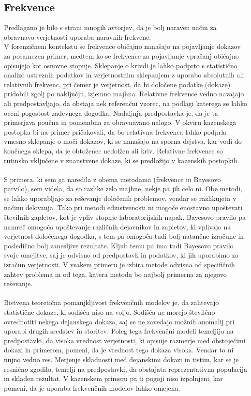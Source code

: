 \documentclass[12pt,a4paper]{amsart}
\theoremstyle{definition} %
\theoremstyle{plain} %
\begin{document}
\subsection{Frekvence}
Predlagano je bilo s strani mnogih avtorjev, da je bolj naraven način za obravnavo verjetnosti uporaba naravnih frekvenc.\\
V forenzičnem kontekstu se frekvence običajno nanašajo na pojavljanje dokazov za posamezen primer, medtem ko se frekvence za
pojavljanje vprašanj običajno opisujejo kot osnovne stopnje. Sklepanje o krivdi je lahko podprto s statistično analizo
ustreznih podatkov in verjetnostnim sklepanjem z uporabo absolutnih ali relativnih frekvenc, pri čemer je verjetnost, da bi določene
podatke (dokaze) pridobili zgolj po naključju, izjemno majhna. Relativne frekvence vedno navajajo ali predpostavljajo, da obstaja nek
referenčni vzorec, na podlagi katerega se lahko oceni pogostost zadevnega dogodka. Nadaljnja predpostavka je, da je ta primerjava poučna
in pomembna za obravnavano nalogo. V okviru kazenskega postopka bi na primer pričakovali, da bo relativna frekvenca lahko podprla
vmesno sklepanje o moči dokazov, ki se nanašajo na sporna dejstva, kar vodi do končnega sklepa, da je obtoženec nedolžen ali kriv. Relativne
frekvence so rutinsko vključene v znanstvene dokaze, ki se predložijo v kazenskih postopkih.\\\\
S primera, ki sem ga naredila z obema metodama (frekvence in Bayesovo parvilo), sem videla, da so razlike zelo majhne, nekje pa jih celo ni.  Obe metodi, 
se lahko uporabljajo za reševanje določenih problemov, vendar se razlikujeta v načinu delovanja. Tako pri metodi edinstvenosti ni mogoče enostavno 
upoštevati številnih zapletov, kot je vpliv stopnje laboratorijskih napak. Bayesovo pravilo pa namreč omogoča upoštevanje različnih dejavnikov in 
zapletov, ki vplivajo na verjetnost določenega dogodka, s tem pa omogoča tudi bolj natančne izračune in posledično bolj zanesljive rezultate. Kljub 
temu pa ima tudi Bayesovo pravilo svoje omejitve, saj je odvisno od predpostavk in podatkov, ki jih uporabimo za izračun verjetnosti. V vsakem primeru je 
izbira metode odvisna od specifičnih zahtev problema in od tega, katera metoda bo najbolj primerna za njegovo reševanje.\\\\
Bistvena teoretična pomanjkljivost frekvenčnih modelov je, 
da zahtevajo statistične dokaze, ki sodišču niso na voljo. Sodišča ne morejo številčno ovrednotiti nekega dejanskega dokaza, saj se ne zavedajo možnih 
anomalij pri uporabi drugih sredstev in storitev. Poleg tega frekvenčni modeli temeljijo na predpostavki, da visoka vrednost verjetnosti, ki opisuje razmerje 
med obstoječimi dokazi in primerom, pomeni, da je vrednost tega dokaza visoka. Vendar to ni nujno vedno res. Merjenje skladnosti med dejanskimi dokazi 
in tistim, kar se je resnično zgodilo, temelji na predpostavki, da obstajata reprezentativna populacija in skladen rezultat. V kazenskem primeru pa 
ti pogoji niso izpolnjeni, kar pomeni, da je uporaba frekvenčnih modelov lahko omejena.
\end{document}

